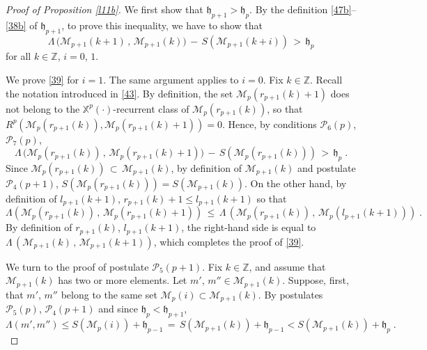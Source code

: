 \documentclass[reqno]{amsart}
\theoremstyle{plain}
\theoremstyle{definition}
\newcommand{\mc}[1]{{\mathcal #1}}
\newcommand{\mf}[1]{{\mathfrak #1}}
\newcommand{\bb}[1]{{\mathbb #1}}
\newcommand{\ms}[1]{{\mathscr #1}}
\newcounter{as}[section]
\newcommand{\<}{\langle}
\renewcommand{\>}{\rangle}
\begin{document}
\begin{proof}[Proof of Proposition \ref{l11b}]
We first show that $\mf h_{p+1} > \mf h_p$. By the definition
\eqref{47b}--\eqref{38b} of $\mf h_{p+1}$, to prove this inequality,
we have to show that
\begin{equation}
\label{39}
\Lambda\, \big (\ms M_{p+1}(k+ 1) \,,\,
\ms M_{p+1}(k)\big) \,-\,
S(\ms M_{p+1}( k+i)) \,>\, \mf h_p
\end{equation}
for all $k\in \bb Z$, $i = 0$, $1$.

We prove \eqref{39} for $i=1$. The same argument applies to $i=0$. Fix
$k\in \bb Z$. Recall the notation introduced in \eqref{43}. By
definition, the set $\ms M_{p} (r_{p+1}(k)+1)$ does not belong to the
$\bb X^p(\cdot)$-recurrent class of $\ms M_{p} (r_{p+1}(k))$, so that
$R^p(\ms M_{p} (r_{p+1}(k)), \ms M_{p} (r_{p+1} (k)+1)) =0$. Hence, by
conditions $\mc P_6(p)$, $\mc P_7(p)$,
\begin{equation*}
\Lambda\, \big (\ms M_{p}(r_{p+1}(k)) \,,\,
\ms M_{p}(r_{p+1}(k)+1)\big) \,-\,
S(\ms M_{p}( r_{p+1}(k))) \,>\, \mf h_p \;.
\end{equation*}
Since $\ms M_{p} (r_{p+1}(k)) \,\subset\, \ms M_{p+1} (k)$, by definition
of $\ms M_{p+1} (k)$ and postulate $\mc P_4(p+1)$,
$S(\ms M_{p}( r_{p+1}(k))) = S(\ms M_{p+1} (k))$. On the other
hand, by definition of $l_{p+1}(k+1)$, $r_{p+1}(k)+1 \le l_{p+1}(k+1)$ so that
\begin{equation*}
\Lambda (\ms M_{p}(r_{p+1}(k)) \,,\,
\ms M_{p}(r_{p+1}(k)+1) )  \,\le\,  \Lambda\, (\ms M_{p}(r_{p+1}(k)) \,,\,
\ms M_{p}(l_{p+1}(k+1)))\;.
\end{equation*}
By definition of $r_{p+1}(k)$, $l_{p+1}(k+1)$, the right-hand side is
equal to $\Lambda\, (\ms M_{p+1}(k) \,,\, \ms M_{p+1}(k+1))$, which
completes the proof of \eqref{39}.

\smallskip We turn to the proof of postulate $\mc P_5(p+1)$.  Fix
$k\in \bb Z$, and assume that $\ms M_{p+1}(k)$ has two or more
elements. Let $m'$, $m'' \in \ms M_{p+1}(k)$. Suppose, first, that
$m'$, $m''$ belong to the same set
$\ms M_{p}(i) \subset \ms M_{p+1}(k)$. By postulates $\mc P_5(p)$,
$\mc P_{4}(p+1)$ and since $\mf h_p < \mf h_{p+1}$,
\begin{equation*}
\Lambda (m' ,m'') \le  S(\ms M_{p}(i) ) + \mf
h_{p-1}  \,=\,  S(\ms M_{p+1}(k) ) + \mf h_{p-1} <
S(\ms M_{p+1}(k) ) + \mf h_{p}\;.
\end{equation*} 


\end{proof}
\end{document}
